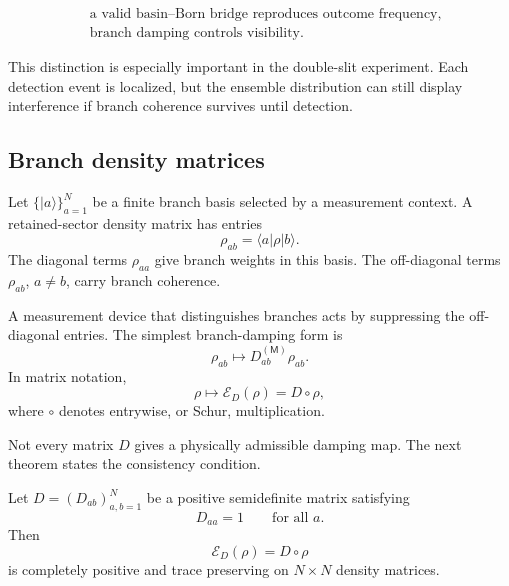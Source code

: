 \documentclass[11pt]{article}
\newcommand{\Meas}{\mathsf M}
\begin{document}
\begin{align}
  &\boxed{\text{a valid basin--Born bridge reproduces outcome frequency}},
  \\
  &\boxed{\text{branch damping controls visibility}}.
\end{align}

This distinction is especially important in the double-slit experiment. Each detection event
is localized, but the ensemble distribution can still display interference if branch coherence
survives until detection.

\subsection{Branch density matrices}
\label{subsec:branch-density-matrices}

Let \(\{|a\rangle\}_{a=1}^N\) be a finite branch basis selected by a measurement context.
A retained-sector density matrix has entries
\begin{equation}
  \rho_{ab}
  =
  \langle a|\rho|b\rangle.
\end{equation}
The diagonal terms \(\rho_{aa}\) give branch weights in this basis. The off-diagonal terms
\(\rho_{ab}\), \(a\neq b\), carry branch coherence.

A measurement device that distinguishes branches acts by suppressing the off-diagonal
entries. The simplest branch-damping form is
\begin{equation}
  \rho_{ab}
  \longmapsto
  D_{ab}^{(\Meas)}\rho_{ab}.
  \label{eq:branch-damping-map-entry}
\end{equation}
In matrix notation,
\begin{equation}
  \rho
  \longmapsto
  \mathcal E_D(\rho)
  =
  D\circ \rho,
  \label{eq:schur-map}
\end{equation}
where \(\circ\) denotes entrywise, or Schur, multiplication.

Not every matrix \(D\) gives a physically admissible damping map. The next theorem states
the consistency condition.

\begin{theorem}
\label{thm:schur-channel}
Let \(D=(D_{ab})_{a,b=1}^N\) be a positive semidefinite matrix satisfying
\begin{equation}
  D_{aa}=1
  \qquad
  \text{for all }a.
  \label{eq:D-diagonal-one}
\end{equation}
Then
\begin{equation}
  \mathcal E_D(\rho)=D\circ\rho
\end{equation}
is completely positive and trace preserving on \(N\times N\) density matrices.
\end{theorem}
\end{document}

